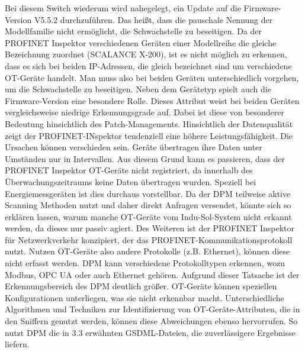 \noindent Bei diesem Switch wiederum wird nahegelegt, ein Update auf die Firmware-Version V5.5.2 durchzuführen. Das heißt, dass die pauschale Nennung der Modellfamilie nicht ermöglicht, die Schwachstelle zu beseitigen. Da der PROFINET Inspektor verschiedenen Geräten einer Modellreihe die gleiche Bezeichnung zuordnet (SCALANCE X-200), ist es nicht möglich zu erkennen, dass es sich bei beiden IP-Adressen, die gleich bezeichnet sind um verschiedene OT-Geräte handelt. Man muss also bei beiden Geräten unterschiedlich vorgehen, um die Schwachstelle zu beseitigen. Neben dem Gerätetyp spielt auch die Firmware-Version eine besondere Rolle. Dieses Attribut weist bei beiden Geräten vergleichsweise niedrige Erkennungsgrade auf. Dabei ist diese von besonderer Bedeutung hinsichtlich des Patch-Managements. Hinsichtlich der Datenqualität zeigt der PROFINET-INspektor tendenziell eine höhere Leistungsfähigkeit. Die Ursachen können verschieden sein. Geräte übertragen ihre Daten unter Umständen nur in Intervallen. Aus diesem Grund kann es passieren, dass der PROFINET Inspektor OT-Geräte nicht registriert, da innerhalb des Überwachungszeitraums keine Daten übertragen wurden. Speziell bei Energiemessgeräten ist dies durchaus vorstellbar. Da der DPM teilweise aktive Scanning Methoden nutzt und daher direkt Anfragen versendet, könnte sich so erklären lassen, warum manche OT-Geräte vom Indu-Sol-System nicht erkannt werden, da dieses nur passiv agiert. Des Weiteren ist der PROFINET Inspektor für Netzwerkverkehr konzipiert, der das PROFINET-Kommunikationsprotokoll nutzt. Nutzen OT-Geräte also andere Protokolle (z.B. Ethernet), können diese nicht erfasst werden. DPM kann verschiedene Protokolltypen erkennen, wozu Modbus, OPC UA oder auch Ethernet gehören. Aufgrund dieser Tatsache ist der Erkennungsbereich des DPM deutlich größer. OT-Geräte können speziellen Konfigurationen unterliegen, was sie nicht erkennbar macht. Unterschiedliche Algorithmen und Techniken zur Identifizierung von OT-Geräte-Attributen, die in den Sniffern genutzt werden, können diese Abweichungen ebenso hervorrufen. So nutzt DPM die in 3.3 erwähnten GSDML-Dateien, die zuverlässigere Ergebnisse liefern.

